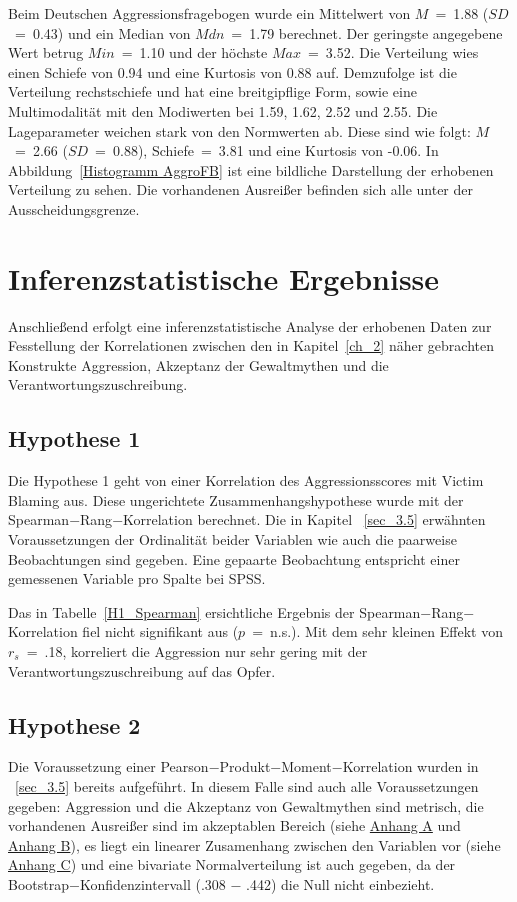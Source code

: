 
Beim Deutschen Aggressionsfragebogen wurde ein Mittelwert von $M$~=~1.88 ($SD$~=~0.43) und ein Median von $Mdn$~=~1.79 berechnet. Der geringste angegebene Wert betrug $Min$~=~1.10 und der höchste $Max$~=~3.52. Die Verteilung wies einen Schiefe von 0.94 und eine Kurtosis von 0.88 auf. Demzufolge ist die Verteilung rechstschiefe und hat eine breitgipflige Form, sowie eine Multimodalität mit den Modiwerten bei 1.59, 1.62, 2.52 und 2.55. Die Lageparameter weichen stark von den Normwerten ab. Diese sind wie folgt: $M$~=~2.66 ($SD$~=~0.88), Schiefe~=~3.81 und eine Kurtosis von -0.06. In Abbildung~\ref{Histogramm AggroFB} ist eine bildliche Darstellung der erhobenen Verteilung zu sehen. Die vorhandenen Ausreißer befinden sich alle unter der Ausscheidungsgrenze.


\section{Inferenzstatistische Ergebnisse}    \label{sec_4.2}
Anschließend erfolgt eine inferenzstatistische Analyse der erhobenen Daten zur Fesstellung der Korrelationen zwischen den in Kapitel~\ref{ch_2} näher gebrachten Konstrukte Aggression, Akzeptanz der Gewaltmythen und die Verantwortungszuschreibung. 


\subsection{Hypothese 1}    \label{subsec_4.2.1}
Die Hypothese 1 geht von einer Korrelation des Aggressionsscores mit Victim Blaming aus. Diese ungerichtete Zusammenhangshypothese wurde mit der Spearman$-$Rang$-$Korrelation berechnet. Die in Kapitel ~\ref{sec_3.5} erwähnten Voraussetzungen der Ordinalität beider Variablen wie auch die paarweise Beobachtungen sind gegeben. Eine gepaarte Beobachtung entspricht einer gemessenen Variable pro Spalte bei SPSS.


Das in Tabelle~\ref{H1_Spearman} ersichtliche Ergebnis der Spearman$-$Rang$-$Korrelation fiel nicht signifikant aus ($p$~=~n.s.). Mit dem sehr kleinen Effekt \parencite{Cohen_1992} von $r_{s}$~=~.18, korreliert die Aggression nur sehr gering mit der Verantwortungszuschreibung auf das Opfer.

\subsection{Hypothese 2}    \label{subsec_4.2.2}
Die Voraussetzung einer Pearson$-$Produkt$-$Moment$-$Korrelation wurden in ~\ref{sec_3.5} bereits aufgeführt. In diesem Falle sind auch alle Voraussetzungen gegeben: Aggression und die Akzeptanz von Gewaltmythen sind metrisch, die vorhandenen Ausreißer sind im akzeptablen Bereich (siehe \hyperref[Boxplot_AggroFB]{Anhang A} und \hyperref[Boxplot_DVMAS]{Anhang B}), 
es liegt ein linearer Zusamenhang zwischen den Variablen vor (siehe \hyperref[Linearitat_AggroFB_DVMAS]{Anhang C}) und eine bivariate Normalverteilung ist auch gegeben, da der Bootstrap$-$Konfidenzintervall (.308 $-$ .442) die Null nicht einbezieht.

